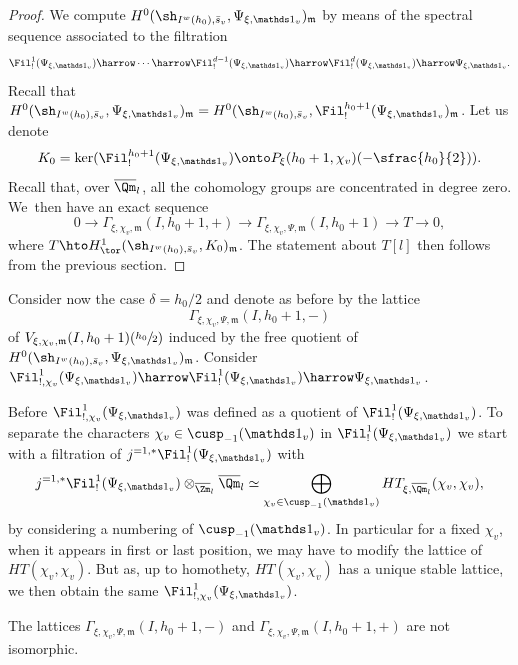 \begin{enumeratea}
\begin{proof}
We compute $H^0(\sh_{I^w(h_0),\bar s_v},\Psi_{\xi,\mathds 1_v})_{\mathfrak m}$ by means of
the spectral sequence associated to the filtration
\[
\Fil^{1}_!(\Psi_{\xi,\mathds 1_v}) \harrow \cdots \harrow \Fil^{d-1}_!
(\Psi_{\xi,\mathds 1_v})
\harrow \Fil^{d}_!(\Psi_{\xi,\mathds 1_v}) \harrow \Psi_{\xi,\mathds 1_v}.
\]
Recall that $H^0(\sh_{I^w(h_0),\bar s_v},\Psi_{\xi,\mathds 1_v})_{\mathfrak m}=
H^0(\sh_{I^w(h_0),\bar s_v},\Fil_!^{h_0+1}(\Psi_{\xi,\mathds 1_v})_{\mathfrak m}$.
Let us denote
\[
K_0 =\ker (\Fil^{h_0+1}_!(\Psi_{\xi,\mathds 1_v}) \onto
P_\xi(h_0+1,\chi_v)(-\sfrac{h_0}{2})).
\]
Recall that, over $\overline \Qm_l$, all the cohomology groups are concentrated
in degree zero. We~then have an exact sequence
\[
0 \to \Gamma_{\xi,\chi_v,\mathfrak m}(I,h_0+1,+) \to
\Gamma_{\xi,\chi_v,\Psi,\mathfrak m}(I,h_0+1)
\to T \to 0,
\]
where $T \hto H^1_{\tor}(\sh_{I^w(h_0),\bar s_v}, K_0)_{\mathfrak m}$.
The statement about $T[l]$ then follows from the previous section.
\end{proof}

\item
Consider now the case $\delta=h_0/2$ and denote as before by the lattice
\[
\Gamma_{\xi,\chi_v,\Psi,\mathfrak m}(I,h_0+1,-)
\]
of $V_{\xi,\chi_v,\mathfrak m}(I,h_0+1)(\sfrac{h_0}{2})$ induced by the free quotient
of $H^0(\sh_{I^w(h_0),\bar s_v},\Psi_{\xi,\mathds 1_v})_{\mathfrak m}$.
Consider $\Fil^1_{!,\chi_v}(\Psi_{\xi,\mathds 1_v}) \harrow \Fil^1_!
(\Psi_{\xi,\mathds 1_v})
\harrow \Psi_{\xi,\mathds 1_v}$.

\begin{remark}
Before $\Fil^1_{!,\chi_v}(\Psi_{\xi,\mathds 1_v})$ was defined as a quotient of
$\Fil^1_!(\Psi_{\xi,\mathds 1_v})$. To separate the characters 
$\chi_v \in \cusp_{-1}(\mathds 1_v)$
in $\Fil^1_!(\Psi_{\xi,\mathds 1_v})$ we start with a filtration of
$j^{=1,*} \Fil^1_!(\Psi_{\xi,\mathds 1_v})$ with
\[
j^{=1,*} \Fil^1_!(\Psi_{\xi,\mathds 1_v}) \otimes_{\overline \Zm_l} \overline \Qm_l
\simeq \bigoplus_{\chi_v \in \cusp_{-1}(\mathds 1_v)} HT_{\xi,\overline \Qm_l}
(\chi_v,\chi_v),
\]
by considering a numbering of $\cusp_{-1}(\mathds 1_v)$. In particular for a fixed
$\chi_v$, when it appears in first or last position, we may have to modify the lattice
of $HT(\chi_v,\chi_v)$. But as, up to homothety, $HT(\chi_v,\chi_v)$ has a unique
stable lattice, we then obtain the same $\Fil^1_{!,\chi_v}(\Psi_{\xi,\mathds 1_v})$.
\end{remark}

\begin{prop} \label{prop-lattice-noniso}
The lattices $\Gamma_{\xi,\chi_v,\Psi,\mathfrak m} (I,h_0+1,-)$ and
$\Gamma_{\xi,\chi_v,\Psi,\mathfrak m} (I,h_0+1,+)$ are not isomorphic.
\end{prop}


\end{enumeratea}
